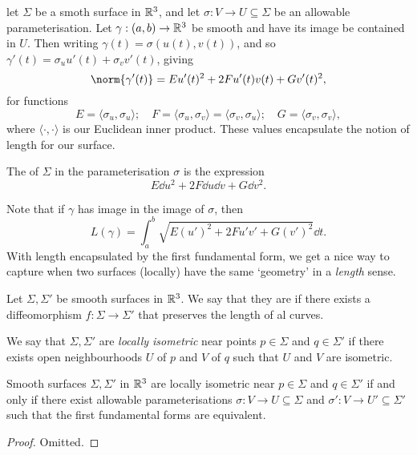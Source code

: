 \documentclass[a4paper]{article}
\begin{document}
let $\Sigma$ be a smoth surface in $\mathbb{R}^3$, and let $\sigma: V \rightarrow U \subseteq \Sigma$ be an allowable parameterisation. Let $\gamma: (a, b) \rightarrow \mathbb{R}^3$ be smooth and have its image be contained in $U$. Then writing $\gamma(t) = \sigma(u(t), v(t))$, and so $\gamma'(t) = \sigma_u u'(t) + \sigma_v v'(t)$, giving
$$
\norm{\gamma'(t)} = E u'(t)^2 + 2F u'(t) v(t) + Gv'(t)^2,
$$
for functions
$$
E = \langle \sigma_u, \sigma_u\rangle; \quad F = \langle \sigma_u, \sigma_v \rangle = \langle \sigma_v, \sigma_u \rangle; \quad G = \langle \sigma_v, \sigma_v \rangle,
$$
where $\langle \cdot, \cdot \rangle$ is our Euclidean inner product. These values encapsulate the notion of length for our surface.

\begin{definition}
    The  of $\Sigma$ in the parameterisation $\sigma$ is the expression
    $$
    E \dd u^2 + 2F \dd u \dd v + G \dd v^2.
    $$
\end{definition}

Note that if $\gamma$ has image in the image of $\sigma$, then
$$
L(\gamma) = \int_a^b \sqrt{E (u')^2 + 2F u' v' + G(v')^2} \dd t.
$$
With length encapsulated by the first fundamental form, we get a nice way to capture when two surfaces (locally) have the same `geometry' in a \emph{length} sense.

\begin{definition}[Isometric]
    Let $\Sigma, \Sigma'$ be smooth surfaces in $\mathbb{R}^3$. We say that they are  if there exists a diffeomorphism $f: \Sigma \rightarrow \Sigma'$ that preserves the length of al curves.
\end{definition}
\begin{definition}
    We say that $\Sigma, \Sigma'$ are \emph{locally isometric} near points $p \in \Sigma$ and $q \in \Sigma'$ if there exists open neighbourhoods $U$ of $p$ and $V$ of $q$ such that $U$ and $V$ are isometric.
\end{definition}
\begin{lemma}
    Smooth surfaces $\Sigma, \Sigma'$ in $\mathbb{R}^3$ are locally isometric near $p \in \Sigma$ and $q \in \Sigma'$ if and only if there exist allowable parameterisations $\sigma: V \rightarrow U \subseteq \Sigma$ and $\sigma': V \rightarrow U' \subseteq \Sigma'$ such that the first fundamental forms are equivalent. 
\end{lemma}
\begin{proof}
    Omitted.
\end{proof}
\end{document}

